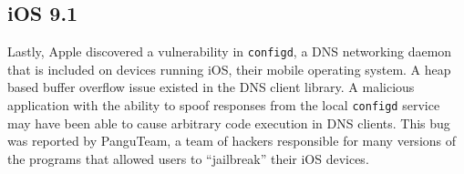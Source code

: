 \subsection{iOS 9.1}

Lastly, Apple discovered a vulnerability in \texttt{configd}, a DNS networking daemon that is included on devices running iOS, their mobile operating system. A heap based buffer overflow issue existed in the DNS client library. A malicious application with the ability to spoof responses from the local \texttt{configd} service may have been able to cause arbitrary code execution in DNS clients. This bug was reported by PanguTeam, a team of hackers responsible for many versions of the programs that allowed users to “jailbreak” their iOS devices. \cite{apple_ios_2016}
